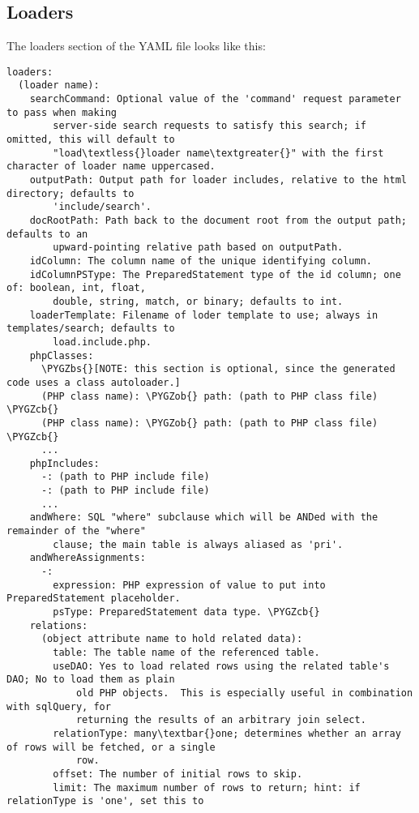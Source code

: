 \documentclass[letterpaper,10pt,english]{sphinxmanual}
\def\PYGZbs{\char`\\}
\def\PYGZob{\char`\{}
\def\PYGZcb{\char`\}}
\begin{document}
\subsection{Loaders}
\label{jaxFrameworkGuide:loaders}
The loaders section of the YAML file looks like this:

\begin{Verbatim}[commandchars=\\\{\}]
loaders:
  (loader name):
    searchCommand: Optional value of the 'command' request parameter to pass when making
        server-side search requests to satisfy this search; if omitted, this will default to
        "load\textless{}loader name\textgreater{}" with the first character of loader name uppercased.
    outputPath: Output path for loader includes, relative to the html directory; defaults to
        'include/search'.
    docRootPath: Path back to the document root from the output path; defaults to an
        upward-pointing relative path based on outputPath.
    idColumn: The column name of the unique identifying column.
    idColumnPSType: The PreparedStatement type of the id column; one of: boolean, int, float,
        double, string, match, or binary; defaults to int.
    loaderTemplate: Filename of loder template to use; always in templates/search; defaults to
        load.include.php.
    phpClasses:
      \PYGZbs{}[NOTE: this section is optional, since the generated code uses a class autoloader.]
      (PHP class name): \PYGZob{} path: (path to PHP class file) \PYGZcb{}
      (PHP class name): \PYGZob{} path: (path to PHP class file) \PYGZcb{}
      ...
    phpIncludes:
      -: (path to PHP include file)
      -: (path to PHP include file)
      ...
    andWhere: SQL "where" subclause which will be ANDed with the remainder of the "where"
        clause; the main table is always aliased as 'pri'.
    andWhereAssignments:
      -:
        expression: PHP expression of value to put into PreparedStatement placeholder.
        psType: PreparedStatement data type. \PYGZcb{}
    relations:
      (object attribute name to hold related data):
        table: The table name of the referenced table.
        useDAO: Yes to load related rows using the related table's DAO; No to load them as plain
            old PHP objects.  This is especially useful in combination with sqlQuery, for
            returning the results of an arbitrary join select.
        relationType: many\textbar{}one; determines whether an array of rows will be fetched, or a single
            row.
        offset: The number of initial rows to skip.
        limit: The maximum number of rows to return; hint: if relationType is 'one', set this to

\end{Verbatim}
\end{document}
